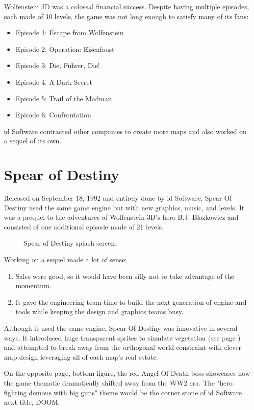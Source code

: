 \documentclass[book.tex]{subfiles}
\begin{document}
Wolfenstein 3D was a colossal financial success. Despite having multiple episodes, each made of 10 levels, the game was not long enough to satisfy many of its fans:\\
\par
\begin{itemize}
\item Episode 1: Escape from Wolfenstein
\item Episode 2: Operation: Eisenfaust
\item Episode 3: Die, Fuhrer, Die!
\item Episode 4: A Dark Secret
\item Episode 5: Trail of the Madman
\item Episode 6: Confrontation
\end{itemize}
id Software contracted other companies to create more maps and also worked on a sequel of its own.

\section{Spear of Destiny}
Released on September 18, 1992 and entirely done by id Software, Spear Of Destiny used the same game engine but with new graphics, music, and levels. It was a prequel to the adventures of Wolfenstein 3D's hero B.J. Blazkowicz and consisted of one additional episode made of 21 levels.\\
   \par
\begin{figure}[H]
\centering
 \caption{Spear of Destiny splash screen.}
 \end{figure}
 \par
 Working on a sequel made a lot of sense:
 \begin{enumerate}
 \item Sales were good, so it would have been silly not to take advantage of the momentum.
 \item It gave the engineering team time to build the next generation of engine and tools while keeping the design and graphics teams busy.
 \end{enumerate}
Although it used the same engine, Spear Of Destiny was innovative in several ways. It introduced huge transparent sprites to simulate vegetation (see page \pageref{spears_of_destiny_play}) and attempted to break away from the orthogonal world constraint with clever map design leveraging all of each map's real estate.\\
    \par
On the opposite page, bottom figure, the red Angel Of Death boss showcases how the game thematic dramatically shifted away from the WW2 era. The "hero fighting demons with big guns" theme would be the corner stone of id Software next title, DOOM. 
\begin{figure}[H]
\centering
 \end{figure}
 \par
 \label{spears_of_destiny_play}
 \begin{figure}[H]
\centering
 \end{figure}
\end{document}
